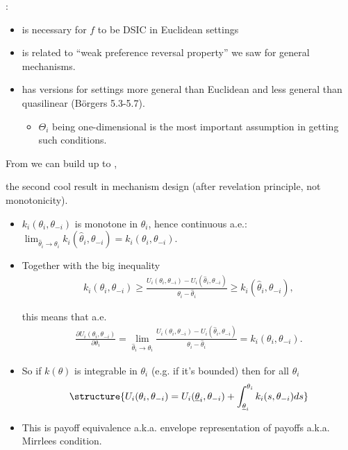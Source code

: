 \documentclass[english,handout]{beamer}		%
\def\lyxframeend{} %
\begin{document}
:
\begin{itemize}
	\item is necessary for $f$ to be DSIC in Euclidean settings
	\item is related to ``weak preference reversal property'' we saw for general mechanisms.
	\item has versions for settings more general than Euclidean and less general than quasilinear (B{\"o}rgers 5.3-5.7).
	\begin{itemize}
		\item $\Theta_i$ being one-dimensional is the most important assumption in getting such conditions.
	\end{itemize}
\end{itemize}
From  we can build up to , 

the second cool result in mechanism design (after revelation principle, not monotonicity).
\lyxframeend


\begin{itemize}
	\item $k_i(\theta_i,\theta_{-i})$ is monotone in $\theta_i$, hence continuous a.e.: $\lim_{\hat{\theta}_i \to \theta_i} k_i(\hat{\theta}_i,\theta_{-i}) = k_i(\theta_i,\theta_{-i})$.
	\pause
	\item Together with the big inequality 
	{\small \vspace{-0.5em}\begin{align*}
		k_i(\theta_i,\theta_{-i})
		\geq 
		\frac{ U_i(\theta_i, \theta_{-i}) - U_i(\hat{\theta}_i, \theta_{-i}) }{ \theta_i - \hat{\theta}_i } 
		\geq 
		k_i(\hat{\theta}_i,\theta_{-i}),
	\end{align*}\vspace{-1em}}
	
	this means that a.e.
	\pause
	\vspace{-0.5em}\begin{align*}
		\frac{\partial U_i(\theta_i,\theta_{-i})}{\partial \theta_i} = \lim_{\hat{\theta}_i \to \theta_i} \frac{ U_i(\theta_i, \theta_{-i}) - U_i(\hat{\theta}_i, \theta_{-i}) }{ \theta_i - \hat{\theta}_i }  = k_i(\theta_i,\theta_{-i}).
	\end{align*}\vspace{-1em}
\end{itemize}
\lyxframeend


\begin{itemize}
	\item So if $k(\theta)$ is integrable in $\theta_i$ (e.g. if it's bounded) then for all $\theta_i$
	\vspace{-0.5em}\begin{align*}
		\structure{
		U_i(\theta_i, \theta_{-i}) = U_i (\underline{\theta}_i,\theta_{-i}) + \int_{\underline{\theta}_i}^{\theta_i} k_i(s,\theta_{-i}) d s
		}
	\end{align*}\vspace{-1em}
	\item This is \alert{payoff equivalence} a.k.a. envelope representation of payoffs a.k.a. Mirrlees condition.
\end{itemize}
\lyxframeend
\end{document}
